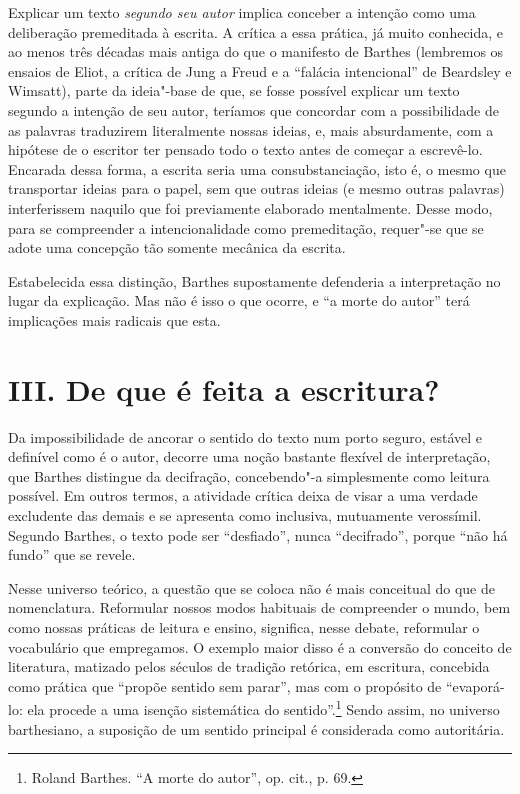 Explicar um texto \emph{segundo seu autor} implica conceber a intenção como uma
deliberação premeditada à escrita. A crítica a essa prática, já muito
conhecida, e ao menos três décadas mais antiga do que o manifesto de
Barthes (lembremos os ensaios de Eliot, a crítica de Jung a Freud e a
``falácia intencional'' de Beardsley e Wimsatt), parte da ideia"-base de
que, se fosse possível explicar um texto segundo a intenção de seu
autor, teríamos que concordar com a possibilidade de as palavras
traduzirem literalmente nossas ideias, e, mais absurdamente, com a
hipótese de o escritor ter pensado todo o texto antes de começar a
escrevê-lo. Encarada dessa forma, a escrita seria uma consubstanciação,
isto é, o mesmo que transportar ideias para o papel, sem que outras
ideias (e mesmo outras palavras) interferissem naquilo que foi
previamente elaborado mentalmente. Desse modo, para se compreender a
intencionalidade como premeditação, requer"-se que se adote uma concepção
tão somente mecânica da escrita.

Estabelecida essa distinção, Barthes supostamente defenderia a
interpretação no lugar da explicação. Mas não é isso o que ocorre, e ``a
morte do autor'' terá implicações mais radicais que esta.

\section*{III. De que é feita a escritura?}

Da impossibilidade de ancorar o sentido do texto num porto seguro,
estável e definível como é o autor, decorre uma noção bastante flexível
de interpretação, que Barthes distingue da decifração, concebendo"-a
simplesmente como leitura possível. Em outros termos, a atividade
crítica deixa de visar a uma verdade excludente das demais e se
apresenta como inclusiva, mutuamente verossímil. Segundo Barthes, o
texto pode ser ``desfiado'', nunca ``decifrado'', porque ``não há
fundo'' que se revele.

Nesse universo teórico, a questão que se coloca não é mais conceitual do
que de nomenclatura. Reformular nossos modos habituais de compreender o
mundo, bem como nossas práticas de leitura e ensino, significa, nesse
debate, reformular o vocabulário que empregamos. O exemplo maior disso é
a conversão do conceito de literatura, matizado pelos séculos de
tradição retórica, em escritura, concebida como prática que ``propõe
sentido sem parar'', mas com o propósito de ``evaporá-lo: ela procede a
uma isenção sistemática do sentido''.\footnote{Roland Barthes. ``A morte
  do autor'', op. cit., p. 69.} Sendo assim, no universo barthesiano, a
suposição de um sentido principal é considerada como autoritária.

